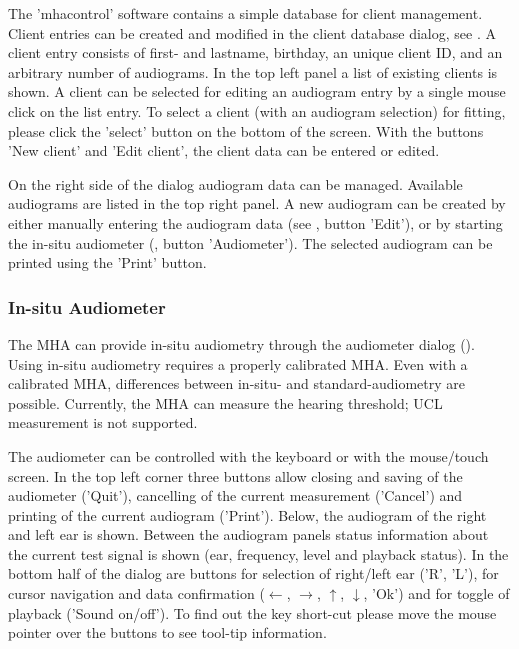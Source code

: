 \documentclass[11pt,a4paper,twoside]{article}
\begin{document}
The 'mhacontrol' software contains a simple database for client management.
%
Client entries can be created and modified in the client database
dialog, see .
%
A client entry consists of first- and lastname, birthday, an unique
client ID, and an arbitrary number of
audiograms.
%
In the top left panel a list of existing clients is shown.
%
A client can be selected for editing an audiogram entry by a single
mouse click on the list entry.
%
To select a client (with an audiogram selection) for fitting, please
click the 'select' button on the bottom of the screen.
%
With the buttons 'New client' and 'Edit client', the client data can
be entered or edited.


On the right side of the dialog audiogram data can be managed.
%
Available audiograms are listed in the top right panel.
%
A new audiogram can be created by either manually entering the
audiogram data (see , button
'Edit'), or by starting the in-situ audiometer
(, button 'Audiometer').
%
The selected audiogram can be printed using the 'Print' button.

\subsubsection*{In-situ Audiometer}%

The MHA can provide in-situ audiometry through the audiometer dialog
().
%
Using in-situ audiometry requires a properly calibrated MHA.
%
Even with a calibrated MHA, differences between in-situ- and
standard-audiometry are possible.
%
Currently, the MHA can measure the hearing threshold; UCL
measurement is not supported.

The audiometer can be controlled with the keyboard or with the
mouse/touch screen.
%
In the top left corner three buttons allow closing and saving of the
audiometer ('Quit'), cancelling of the current measurement ('Cancel')
and printing of the current audiogram ('Print').
%
Below, the audiogram of the right and left ear is shown.
%
Between the audiogram panels status information about the current test
signal is shown (ear, frequency, level and playback status).
%
In the bottom half of the dialog are buttons for selection of
right/left ear ('R', 'L'), for cursor navigation and data confirmation
($\leftarrow$, $\rightarrow$, $\uparrow$, $\downarrow$, 'Ok') and for
toggle of playback ('Sound on/off').
%
To find out the key short-cut please move the mouse pointer over the
buttons to see tool-tip information.
\end{document}

